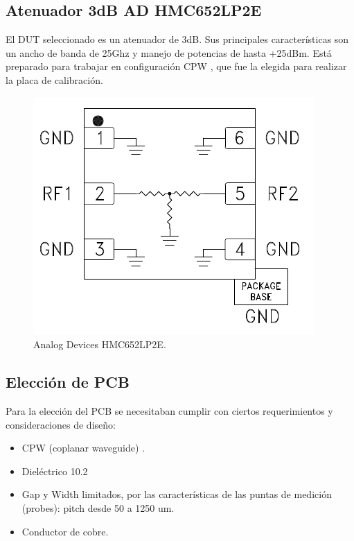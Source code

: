 \documentclass[10pt, a4paper, twocolumn]{article}
\begin{document}

\subsection{Atenuador 3dB AD HMC652LP2E}

El DUT seleccionado es un atenuador de 3dB. Sus principales características son
un ancho de banda de 25Ghz y manejo de potencias de hasta +25dBm. Está preparado
para trabajar en configuración CPW \cite{cpw}, que fue la elegida para realizar la placa de
calibración.

\begin{figure}[hbt!]
	\includegraphics[width=\linewidth]{Fotos/DUT.png}
	\caption{Analog Devices HMC652LP2E.}
\end{figure}


\subsection{Elección de PCB}

Para la elección del PCB se necesitaban cumplir con ciertos requerimientos y
consideraciones de diseño:
\begin{itemize}
	\item CPW (coplanar waveguide) \cite{cpw}.
	\item Dieléctrico 10.2
	\item Gap y Width limitados, por las características de las puntas de medición (probes): pitch desde 50 a 1250 um.
	\item Conductor de cobre.
\end{itemize}
\end{document}
